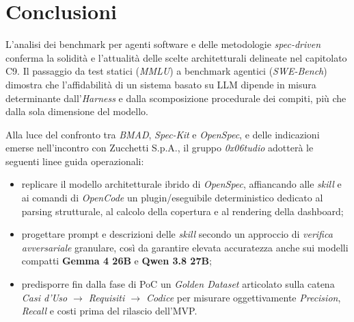 \documentclass[a4paper, 11pt]{article}
\begin{document}

\section{Conclusioni}
L'analisi dei benchmark per agenti software e delle metodologie \textit{spec-driven} conferma la solidità e l'attualità delle scelte architetturali delineate nel capitolato C9. Il passaggio da test statici (\textit{MMLU}) a benchmark agentici (\textit{SWE-Bench}) dimostra che l'affidabilità di un sistema basato su LLM dipende in misura determinante dall'\textit{Harness} e dalla scomposizione procedurale dei compiti, più che dalla sola dimensione del modello.

Alla luce del confronto tra \textit{BMAD}, \textit{Spec-Kit} e \textit{OpenSpec}, e delle indicazioni emerse nell'incontro con Zucchetti S.p.A., il gruppo \textit{0x06tudio} adotterà le seguenti linee guida operazionali:
\begin{itemize}[noitemsep]
    \item replicare il modello architetturale ibrido di \textit{OpenSpec}, affiancando alle \textit{skill} e ai comandi di \textit{OpenCode} un plugin/eseguibile deterministico dedicato al parsing strutturale, al calcolo della copertura e al rendering della dashboard;
    \item progettare prompt e descrizioni delle \textit{skill} secondo un approccio di \textit{verifica avversariale} granulare, così da garantire elevata accuratezza anche sui modelli compatti \textbf{Gemma 4 26B} e \textbf{Qwen 3.8 27B};
    \item predisporre fin dalla fase di PoC un \textit{Golden Dataset} articolato sulla catena \textit{Casi d'Uso $\rightarrow$ Requisiti $\rightarrow$ Codice} per misurare oggettivamente \textit{Precision}, \textit{Recall} e costi prima del rilascio dell'MVP.
\end{itemize}
\end{document}
